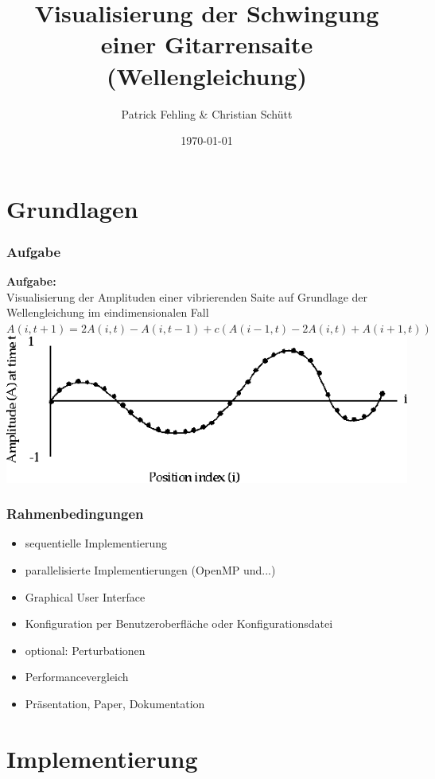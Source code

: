 \documentclass[xcolor=dvipsnames]{beamer}
\title{Visualisierung der Schwingung einer Gitarrensaite (Wellengleichung)}
\author{Patrick Fehling \& Christian Schütt}
\date{\today}
\begin{document}
\maketitle
\frame{\tableofcontents}

\section{Grundlagen}
\begin{frame}\frametitle{Aufgabe}
		\textbf{Aufgabe:}\\
		Visualisierung der Amplituden einer vibrierenden Saite auf Grundlage der Wellengleichung im eindimensionalen Fall\\
		\vspace{1ex}
		$A(i, t + 1) = 2A(i, t) - A(i, t - 1) + c(A(i - 1, t) - 2A(i, t) + A(i + 1, t))$\\
		\vspace{2ex}
		\includegraphics[width=1.0\textwidth,valign=t]{pictures/wellengleichung_aufgabe}
\end{frame}

\begin{frame}\frametitle{Rahmenbedingungen}
	\begin{itemize}
		\item sequentielle Implementierung
		\item parallelisierte Implementierungen (OpenMP und...)
		\item Graphical User Interface
		\item Konfiguration per Benutzeroberfläche oder Konfigurationsdatei
		\item optional: Perturbationen
		\vspace{3ex}
		\item Performancevergleich
		\item Präsentation, Paper, Dokumentation
	\end{itemize}
\end{frame}

\section{Implementierung}
\frame{\tableofcontents[current]}
\end{document}
